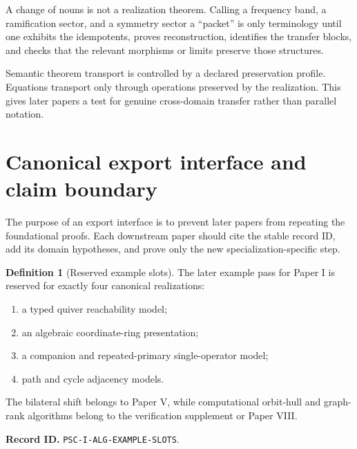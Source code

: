 \documentclass[11pt]{article}
\theoremstyle{definition}
\newtheorem{definition}[definition]{Definition}
\theoremstyle{remark}
\newcommand{\RecordID}[1]{\par\smallskip\noindent\begingroup\footnotesize\color{PSCGray}\raggedright\textbf{Record ID.} \nolinkurl{#1}.\par\endgroup}
\begin{document}
\begin{warningbox}
A change of nouns is not a realization theorem.  Calling a frequency band, a ramification sector, and a symmetry sector a ``packet'' is only terminology until one exhibits the idempotents, proves reconstruction, identifies the transfer blocks, and checks that the relevant morphisms or limits preserve those structures.
\end{warningbox}

\begin{sectionrecap}
Semantic theorem transport is controlled by a declared preservation profile.  Equations transport only through operations preserved by the realization.  This gives later papers a test for genuine cross-domain transfer rather than parallel notation.
\end{sectionrecap}


\section{Canonical export interface and claim boundary}
\begin{readerroadmap}
The purpose of an export interface is to prevent later papers from repeating the foundational proofs.  Each downstream paper should cite the stable record ID, add its domain hypotheses, and prove only the new specialization-specific step.
\end{readerroadmap}

\begin{definition}[Reserved example slots]
\label{def:reserved-example-slots}
The later example pass for Paper I is reserved for exactly four canonical realizations:
\begin{enumerate}[label=(\roman*)]
\item a typed quiver reachability model;
\item an algebraic coordinate-ring presentation;
\item a companion and repeated-primary single-operator model;
\item path and cycle adjacency models.
\end{enumerate}
The bilateral shift belongs to Paper V, while computational orbit-hull and graph-rank algorithms belong to the verification supplement or Paper VIII.
\end{definition}
\RecordID{PSC-I-ALG-EXAMPLE-SLOTS}
\end{document}
